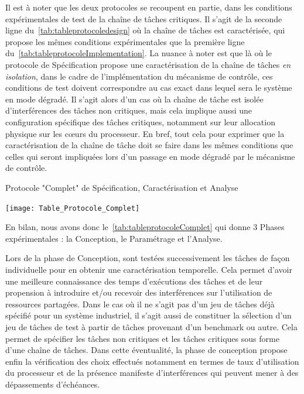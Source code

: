 \documentclass[french, a4paper, 11pt, twoside, pdftex]{StyleThese}
\begin{document}
    Il est à noter que les deux protocoles se recoupent en partie, dans les conditions expérimentales de test de la chaîne de tâches critiques. Il s'agit de la seconde ligne du~\autoref{tab:tableprotocoledesign} où la chaîne de tâches est caractérisée, qui propose les mêmes conditions expérimentales que la première ligne du~\autoref{tab:tableprotocoleImplementation}. La nuance à noter est que là où le protocole de Spécification propose une caractérisation de la chaîne de tâches \textit{en isolation}, dans le cadre de l'implémentation du mécanisme de contrôle, ces conditions de test doivent correspondre au cas exact dans lequel sera le système en mode dégradé. Il s'agit alors d'un cas où la chaîne de tâche est isolée d'interférences des tâches non critiques, mais cela implique aussi une configuration spécifique des tâches critiques, notamment sur leur allocation physique sur les cœurs du processeur. 
    En bref, tout cela pour exprimer que la caractérisation de la chaîne de tâche doit se faire dans les mêmes conditions que celles qui seront impliquées lors d'un passage en mode dégradé par le mécanisme de contrôle.
    
    \begin{table}[ht]
    	\centering
    	\caption{Protocole "Complet" de Spécification, Caractérisation et Analyse}
    	\label{tab:tableprotocoleComplet}
    	\texttt{[image: Table\_Protocole\_Complet]}
    \end{table}

   	En bilan, nous avons donc le~\autoref{tab:tableprotocoleComplet} qui donne 3 Phases expérimentales : la Conception, le Paramétrage et l'Analyse. 
   	
   	Lors de la phase de Conception, sont testées successivement les tâches de façon individuelle pour en obtenir une caractérisation temporelle. Cela permet d'avoir une meilleure connaissance des temps d'exécutions des tâches et de leur propension à introduire et/ou recevoir des interférences sur l'utilisation de ressources partagées. Dans le cas où il ne s'agit pas d'un jeu de tâches déjà spécifié pour un système industriel, il s'agit aussi de constituer la sélection d'un jeu de tâches de test à partir de tâches provenant d'un benchmark ou autre. Cela permet de spécifier les tâches non critiques et les tâches critiques sous forme d'une chaîne de tâches. Dans cette éventualité, la phase de conception propose enfin la vérification des choix effectués notamment en termes de taux d'utilisation du processeur et de la présence manifeste d'interférences qui peuvent mener à des dépassements d'échéances.
   	
\end{document}
